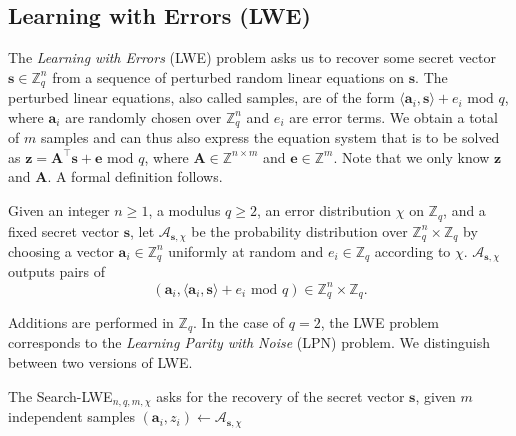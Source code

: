 \subsection{Learning with Errors (LWE)} \label{sec:lwe}
The \textit{Learning with Errors} (LWE) problem asks us to recover some secret vector $\mathbf{s} \in \mathbb{Z}_q^n$ from a sequence of perturbed random linear equations on $\mathbf{s}$. The perturbed linear equations, also called samples, are of the form $\langle\mathbf{a}_i, \mathbf{s}\rangle + e_i \text{ mod } q$, where $\mathbf{a}_i$ are randomly chosen over $\mathbb{Z}_q^n$ and $e_i$ are error terms. We obtain a total of $m$ samples and can thus also express the equation system that is to be solved as $\mathbf{z} = \mathbf{A}^\intercal \mathbf{s} + \mathbf{e} \text{ mod } q$, where $\mathbf{A} \in \mathbb{Z}^{n \times m}$ and $\mathbf{e} \in \mathbb{Z}^m$. Note that we only know $\mathbf{z}$ and $\mathbf{A}$. A formal definition follows.

\begin{definition} %
    Given an integer $n \geq 1$, a modulus $q \geq 2$, an error distribution $\chi$ on $\mathbb{Z}_q$, and a fixed secret vector $\mathbf{s}$, let $\mathcal{A}_{\mathbf{s}, \chi}$ be the probability distribution over $\mathbb{Z}_q^n \times \mathbb{Z}_q$ by choosing a vector $\mathbf{a}_i \in \mathbb{Z}_q^n$ uniformly at random and $e_i \in \mathbb{Z}_q$ according to $\chi$.  $\mathcal{A}_{\mathbf{s}, \chi}$ outputs pairs of
    \begin{equation}
        (\mathbf{a}_i, \langle \mathbf{a}_i, \mathbf{s} \rangle + e_i \text{ mod } q) \in \mathbb{Z}_q^n \times \mathbb{Z}_q.
    \end{equation}
\end{definition}

Additions are performed in $\mathbb{Z}_q$. In the case of $q=2$, the LWE problem corresponds to the \textit{Learning Parity with Noise} (LPN) problem. %
We distinguish between two versions of LWE.

\begin{definition} %
    The Search-LWE$_{n, q, m, \chi}$ asks for the recovery of the secret vector $\mathbf{s}$, given $m$ independent samples $(\mathbf{a}_i, z_i) \leftarrow \mathcal{A}_{\mathbf{s}, \chi}$ %
\end{definition}

